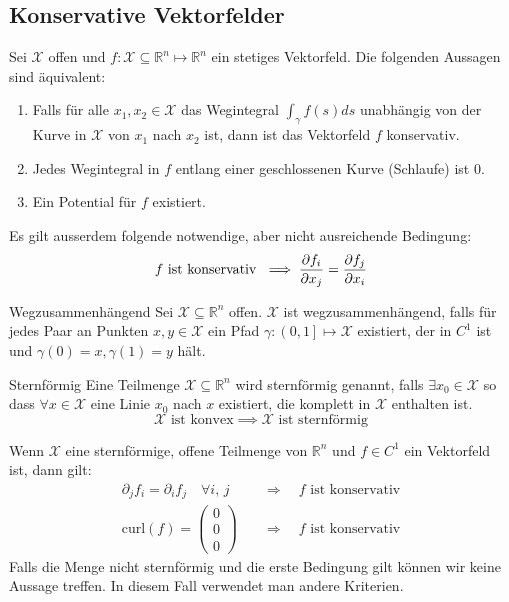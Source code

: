 \documentclass[a4paper,10pt]{article}
\def\R{\mathbb{R}}
\def\X{\mathcal{X}}
\begin{document}
\subsection{Konservative Vektorfelder}
Sei \(\X\) offen und \(f: \X \subseteq \R^n \mapsto \R^n\) ein stetiges Vektorfeld. Die folgenden Aussagen sind äquivalent:
\begin{enumerate}
  \item Falls für alle \(x_1, x_2 \in \X\) das Wegintegral \(\int_\gamma f(s) ds\) unabhängig von der Kurve in \(\X\) von \(x_1\) nach \(x_2\) ist, dann ist das Vektorfeld \(f\) konservativ.
  \item Jedes Wegintegral in \(f\) entlang einer geschlossenen Kurve (Schlaufe) ist 0.
  \item Ein Potential für \(f\) existiert.
\end{enumerate}
Es gilt ausserdem folgende notwendige, aber nicht ausreichende Bedingung:
\[f \text{ ist konservativ }\implies \pdv{f_i}{x_j} = \pdv{f_j}{x_i}\]

\begin{subbox}{Wegzusammenhängend}
  Sei \(\X \subseteq \R^n\) offen. \(\X\) ist wegzusammenhängend, falls für jedes Paar an Punkten \(x, y \in \X\) ein Pfad \(\gamma : \left(0,1\right] \mapsto \X\) existiert, der in \(C^1\) ist und \(\gamma(0) = x, \gamma(1) = y\) hält.
\end{subbox}

\begin{subbox}{Sternförmig}
  Eine Teilmenge \(\X \subseteq \R^n\) wird sternförmig genannt, falls \(\exists x_0 \in \X\) so dass \(\forall x \in \X\) eine Linie \(x_0\) nach \(x\) existiert, die komplett in \(\X\) enthalten ist. 
  \[\X \text{ ist konvex} \implies \X \text{ ist sternförmig}\]
\end{subbox}
Wenn \(\X\) eine sternförmige, offene Teilmenge von \(\R^n\) und \(f \in C^1\) ein Vektorfeld ist, dann gilt:
\begin{align*}
  \partial_j f_i = \partial_i f_j \quad \forall i,\, j
  \quad &\Rightarrow \quad \text{$f$ ist konservativ}\\
  \text{curl}(f) = \begin{pmatrix}
    0\\0\\0
  \end{pmatrix}
  \quad &\Rightarrow \quad \text{$f$ ist konservativ}
\end{align*}
Falls die Menge nicht sternförmig und die erste Bedingung gilt können wir keine Aussage treffen. In diesem Fall verwendet man andere Kriterien.
\end{document}
